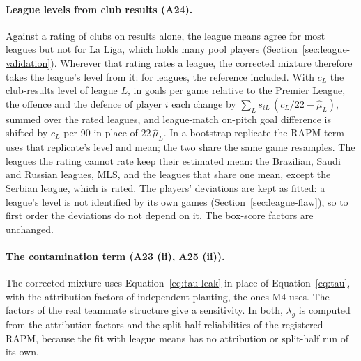 \documentclass[11pt,a4paper]{article}
\begin{document}
\paragraph{League levels from club results (A24).}
Against a rating of clubs on results alone, the league means agree for most
leagues but not for La Liga, which holds many pool players
(Section~\ref{sec:league-validation}). Wherever that rating rates a league,
the corrected mixture therefore takes the league's level from it: for
\LeagueClubNLeagues{} leagues, the reference included. With $c_L$ the
club-results level of league $L$, in goals per game relative to the Premier
League, the offence and the defence of player $i$ each change by
$\sum_L s_{iL}\, (c_L/22 - \hat\mu_L)$, summed over the rated leagues, and
league-match on-pitch goal difference is shifted by $c_L$ per 90 in place of
$22\,\hat\mu_L$. In a bootstrap replicate the RAPM term uses that replicate's
level and mean; the two share the same game resamples. The leagues the rating
cannot rate keep their estimated mean: the Brazilian, Saudi and Russian
leagues, MLS, and the leagues that share one mean, except the Serbian league,
which is rated. The players' deviations are kept as fitted: a league's level
is not identified by its own games (Section~\ref{sec:league-flaw}), so to
first order the deviations do not depend on it. The box-score factors are
unchanged.

\paragraph{The contamination term (A23 (ii), A25 (ii)).}
The corrected mixture uses Equation~\eqref{eq:tau-leak} in place of
Equation~\eqref{eq:tau}, with the attribution factors of independent planting,
the ones M4 uses. The factors of the real teammate structure give a sensitivity. In
both, $\lambda_g$ is computed from the attribution factors and the split-half
reliabilities of the registered RAPM, because the fit with league means has no
attribution or split-half run of its own.
\end{document}
